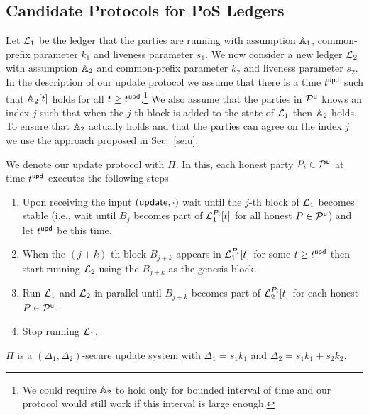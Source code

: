 \subsection{Candidate Protocols for PoS Ledgers}

Let $\mathcal{L}_1$ be the ledger that the parties are running with assumption $\mathbb{A}_1$, common-prefix parameter $k_1$ 
and  liveness parameter $s_1$. 
We now consider a new ledger $\mathcal{L}_2$ with assumption $\mathbb{A}_2$ and common-prefix parameter $k_2$ and  liveness parameter $s_2$.
In the description of our update protocol we assume that there is a time $t^{\mathsf{upd}}$ such that $\mathbb{A}_2[t]$ holds for all $t\geq t^{\mathsf{upd}}$.\footnote{We could require $\mathbb{A}_2$ to
hold only for bounded interval of time and our protocol would still work if this interval is large enough.}
We also assume that the parties in $\mathcal{P}^\mathsf{u}$ knows an index $j$ such that when the $j$-th block is added to the state of $\mathcal{L}_1$ then $\mathbb{A}_2$ holds. 
To ensure that $\mathbb{A}_2$ actually holds and that the parties can agree on the index $j$ we use the approach proposed in Sec.~\ref{se:u}. 

We denote our update protocol with $\Pi$. In this, each honest party $P_i\in\mathcal{P}^\mathsf{u}$ at time $t^{\mathsf{upd}}$ executes the following steps

\begin{enumerate}
	\item Upon receiving the input $(\mathsf{update}, \cdot)$ wait until the $j$-th block of $\mathcal{L}_1$ becomes stable (i.e., wait until $B_{j}$ becomes part of $\mathcal{L}_1^{P_i}[t]$ 
	for all honest $P\in\mathcal{P}^\mathsf{u}$) and let $t^{\mathsf{upd}}$ be this time.
	\item When the $(j+k)$-th block $B_{j+k}$ appears in $\mathcal{L}_1^{P_i}[t]$ for some $t\geq t^{\mathsf{upd}}$ then 
	start running $\mathcal{L}_2$ using the $B_{j+k}$ as the genesis block.
	\item Run $\mathcal{L}_1$ and $\mathcal{L}_2$ in parallel until $B_{j+k}$ becomes part of $\mathcal{L}_2^{P_i}[t]$ 
	for each honest $P\in\mathcal{P}^\mathsf{u}$.
	\item Stop running $\mathcal{L}_1$.
\end{enumerate}



\begin{theorem}
$\Pi$ is a $(\Delta_1,\Delta_2)$-secure update system with $\Delta_1=s_1 k_1$ and $\Delta_2=s_1 k_1 + s_2 k_2$.
\end{theorem}

